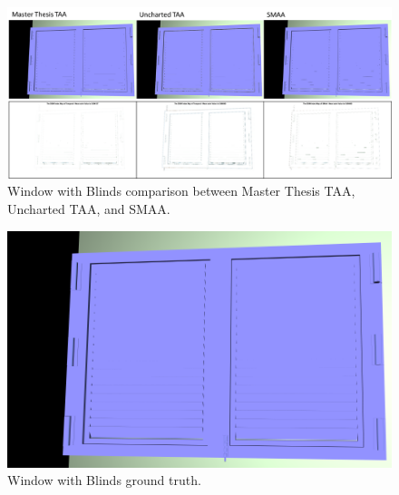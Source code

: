 \documentclass{cslthse-msc}
\begin{document}
\begin{figure}[H]
	\centering
	\includegraphics[scale=0.8]{images/results/window_blind.png}
	\caption{Window with Blinds comparison between Master Thesis TAA, Uncharted TAA, and SMAA.}\label{fig:window_blind_render}
\end{figure}

\begin{figure}[H]
	\centering
	\includegraphics[scale=0.14]{images/results/window_blind_sobel_ground_truth.png}
	\caption{Window with Blinds ground truth.}\label{fig:window_blind_truth}
\end{figure}
\end{document}
